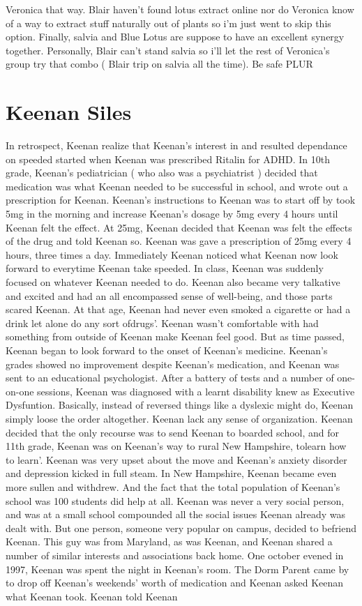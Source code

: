 \documentclass[12pt]{book}
\begin{document}
Veronica that way. Blair haven't found lotus extract online nor do Veronica know of a way to extract stuff naturally out of plants so i'm just went to skip this option. Finally, salvia and Blue Lotus are suppose to have an excellent synergy together. Personally, Blair can't stand salvia so i'll let the rest of Veronica's group try that combo ( Blair trip on salvia all the time). Be safe PLUR



\chapter{Keenan Siles}

In retrospect, Keenan realize that Keenan's interest in and resulted dependance on speeded started when Keenan was prescribed Ritalin for ADHD. In 10th grade, Keenan's pediatrician ( who also was a psychiatrist ) decided that medication was what Keenan needed to be successful in school, and wrote out a prescription for Keenan. Keenan's instructions to Keenan was to start off by took 5mg in the morning and increase Keenan's dosage by 5mg every 4 hours until Keenan felt the effect. At 25mg, Keenan decided that Keenan was felt the effects of the drug and told Keenan so. Keenan was gave a prescription of 25mg every 4 hours, three times a day. Immediately Keenan noticed what Keenan now look forward to everytime Keenan take speeded. In class, Keenan was suddenly focused on whatever Keenan needed to do. Keenan also became very talkative and excited and had an all encompassed sense of well-being, and those parts scared Keenan. At that age, Keenan had never even smoked a cigarette or had a drink let alone do any sort ofdrugs'. Keenan wasn't comfortable with had something from outside of Keenan make Keenan feel good. But as time passed, Keenan began to look forward to the onset of Keenan's medicine. Keenan's grades showed no improvement despite Keenan's medication, and Keenan was sent to an educational psychologist. After a battery of tests and a number of one-on-one sessions, Keenan was diagnosed with a learnt disability knew as Executive Dysfuntion. Basically, instead of reversed things like a dyslexic might do, Keenan simply loose the order altogether. Keenan lack any sense of organization. Keenan decided that the only recourse was to send Keenan to boarded school, and for 11th grade, Keenan was on Keenan's way to rural New Hampshire, tolearn how to learn'. Keenan was very upset about the move and Keenan's anxiety disorder and depression kicked in full steam. In New Hampshire, Keenan became even more sullen and withdrew. And the fact that the total population of Keenan's school was 100 students did help at all. Keenan was never a very social person, and was at a small school compounded all the social issues Keenan already was dealt with. But one person, someone very popular on campus, decided to befriend Keenan. This guy was from Maryland, as was Keenan, and Keenan shared a number of similar interests and associations back home. One october evened in 1997, Keenan was spent the night in Keenan's room. The Dorm Parent came by to drop off Keenan's weekends' worth of medication and Keenan asked Keenan what Keenan took. Keenan told Keenan 
\end{document}

